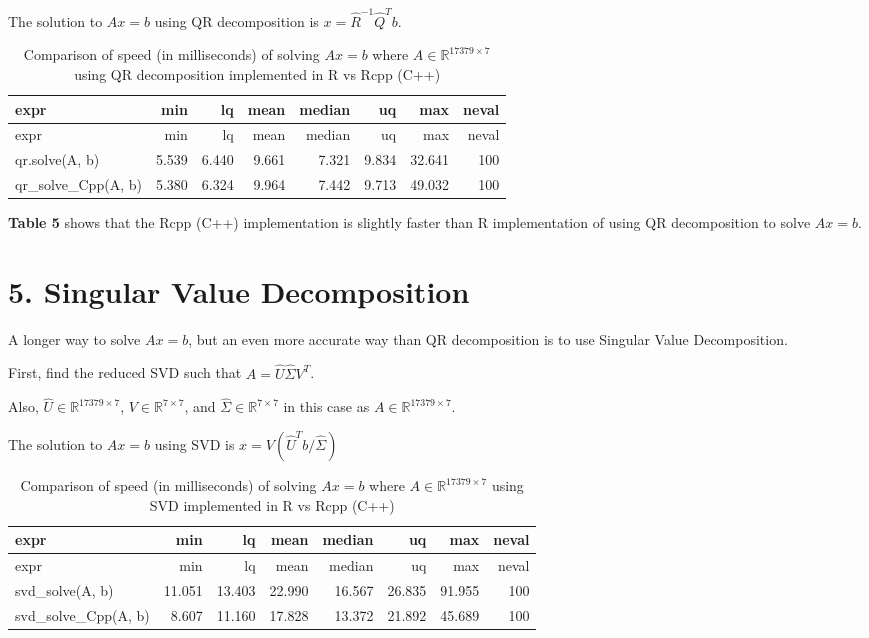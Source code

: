 \documentclass[
]{article}
\begin{document}
The solution to \(Ax = b\) using QR decomposition is
\(x = \hat{R}^{-1}\hat{Q}^{T}b\).

\begin{longtable}[]{@{}lrrrrrrr@{}}
\caption{Comparison of speed (in milliseconds) of solving \(Ax = b\)
where \(A \in \mathbb{R}^{17379 \times 7}\) using QR decomposition
implemented in R vs Rcpp (C++)}\tabularnewline
\toprule
expr & min & lq & mean & median & uq & max & neval\tabularnewline
\midrule
\endfirsthead
\toprule
expr & min & lq & mean & median & uq & max & neval\tabularnewline
\midrule
\endhead
qr.solve(A, b) & 5.539 & 6.440 & 9.661 & 7.321 & 9.834 & 32.641 &
100\tabularnewline
qr\_solve\_Cpp(A, b) & 5.380 & 6.324 & 9.964 & 7.442 & 9.713 & 49.032 &
100\tabularnewline
\bottomrule
\end{longtable}

\textbf{Table 5} shows that the Rcpp (C++) implementation is slightly
faster than R implementation of using QR decomposition to solve
\(Ax = b\).

\hypertarget{singular-value-decomposition}{%
\section{5. Singular Value
Decomposition}\label{singular-value-decomposition}}

A longer way to solve \(Ax = b\), but an even more accurate way than QR
decomposition is to use Singular Value Decomposition.

First, find the reduced SVD such that \(A = \hat{U}\hat{\Sigma}V^{T}\).

Also, \(\hat{U} \in \mathbb{R}^{17379 \times 7}\),
\(V \in \mathbb{R}^{7 \times 7}\), and
\(\hat{\Sigma} \in \mathbb{R}^{7 \times 7}\) in this case as
\(A \in \mathbb{R}^{17379 \times 7}\).

The solution to \(Ax = b\) using SVD is
\(x = V(\hat{U}^{T}b/\hat{\Sigma})\)

\begin{longtable}[]{@{}lrrrrrrr@{}}
\caption{Comparison of speed (in milliseconds) of solving \(Ax = b\)
where \(A \in \mathbb{R}^{17379 \times 7}\) using SVD implemented in R
vs Rcpp (C++)}\tabularnewline
\toprule
expr & min & lq & mean & median & uq & max & neval\tabularnewline
\midrule
\endfirsthead
\toprule
expr & min & lq & mean & median & uq & max & neval\tabularnewline
\midrule
\endhead
svd\_solve(A, b) & 11.051 & 13.403 & 22.990 & 16.567 & 26.835 & 91.955 &
100\tabularnewline
svd\_solve\_Cpp(A, b) & 8.607 & 11.160 & 17.828 & 13.372 & 21.892 &
45.689 & 100\tabularnewline
\bottomrule
\end{longtable}
\end{document}

